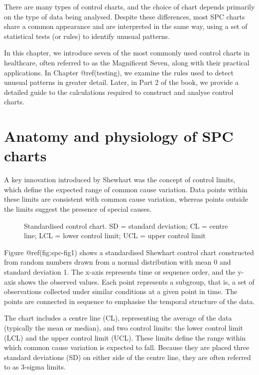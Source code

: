 \documentclass[
]{book}
\makeatletter
\newcommand*\pandocbounded[1]{%
  \sbox\pandoc@box{#1}%
  \Gscale@div\@tempa{\textheight}{\dimexpr\ht\pandoc@box+\dp\pandoc@box\relax}%
  \Gscale@div\@tempb{\linewidth}{\wd\pandoc@box}%
  \ifdim\@tempb\p@<\@tempa\p@\let\@tempa\@tempb\fi%
  \ifdim\@tempa\p@<\p@\scalebox{\@tempa}{\usebox\pandoc@box}%
  \else\usebox{\pandoc@box}%
  \fi%
}
\makeatother
\begin{document}
There are many types of control charts, and the choice of chart depends
primarily on the type of data being analysed. Despite these differences,
most SPC charts share a common appearance and are interpreted in the
same way, using a set of statistical tests (or rules) to identify
unusual patterns.

In this chapter, we introduce seven of the most commonly used control
charts in healthcare, often referred to as the Magnificent Seven, along
with their practical applications. In Chapter @ref(testing), we examine
the rules used to detect unusual patterns in greater detail. Later, in
Part 2 of the book, we provide a detailed guide to the calculations
required to construct and analyse control charts.

\section{Anatomy and physiology of SPC
charts}\label{anatomy-and-physiology-of-spc-charts}

A key innovation introduced by Shewhart was the concept of control
limits, which define the expected range of common cause variation. Data
points within these limits are consistent with common cause variation,
whereas points outside the limits suggest the presence of special
causes.

\begin{figure}
\centering
\pandocbounded{}
\caption{Standardised control chart. SD = standard deviation; CL =
centre line; LCL = lower control limit; UCL = upper control limit}
\end{figure}

Figure @ref(fig:spc-fig1) shows a standardised Shewhart control chart
constructed from random numbers drawn from a normal distribution with
mean 0 and standard deviation 1. The x-axis represents time or sequence
order, and the y-axis shows the observed values. Each point represents a
subgroup, that is, a set of observations collected under similar
conditions at a given point in time. The points are connected in
sequence to emphasise the temporal structure of the data.

The chart includes a centre line (CL), representing the average of the
data (typically the mean or median), and two control limits: the lower
control limit (LCL) and the upper control limit (UCL). These limits
define the range within which common cause variation is expected to
fall. Because they are placed three standard deviations (SD) on either
side of the centre line, they are often referred to as 3-sigma limits.
\end{document}
